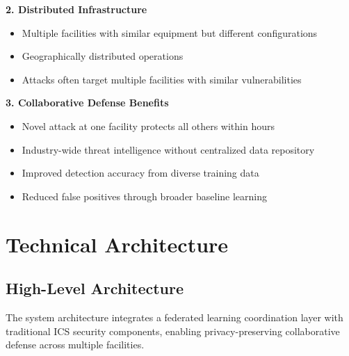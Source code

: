 \documentclass[12pt,a4paper]{article}
\begin{document}
\textbf{2. Distributed Infrastructure}
\begin{itemize}[leftmargin=1cm,itemsep=0pt]
    \item Multiple facilities with similar equipment but different configurations
    \item Geographically distributed operations
    \item Attacks often target multiple facilities with similar vulnerabilities
\end{itemize}

\textbf{3. Collaborative Defense Benefits}
\begin{itemize}[leftmargin=1cm,itemsep=0pt]
    \item Novel attack at one facility protects all others within hours
    \item Industry-wide threat intelligence without centralized data repository
    \item Improved detection accuracy from diverse training data
    \item Reduced false positives through broader baseline learning
\end{itemize}

\vspace{0.3cm}

\section{Technical Architecture}

\subsection{High-Level Architecture}

The system architecture integrates a federated learning coordination layer with traditional ICS security components, enabling privacy-preserving collaborative defense across multiple facilities.
\end{document}
